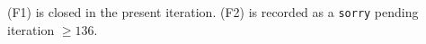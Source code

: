 (F1) is closed in the present iteration. (F2) is recorded as a
\texttt{sorry} pending iteration $\geq 136$.


